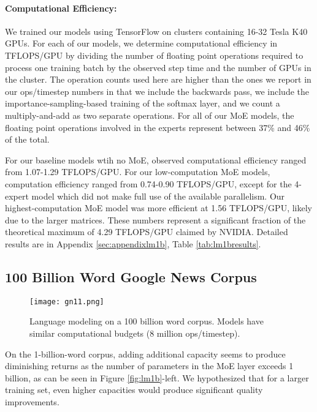 \documentclass{article} \pdfoutput=1
\begin{document}
\paragraph{Computational Efficiency:} We trained our models using TensorFlow \citep{Abadi16} on clusters containing 16-32 Tesla K40 GPUs.  For each of our models, we determine computational efficiency in TFLOPS/GPU by dividing the number of floating point operations required to process one training batch by the observed step time and the number of GPUs in the cluster.  The operation counts used here are higher than the ones we report in our ops/timestep numbers in that we include the backwards pass, we include the importance-sampling-based training of the softmax layer, and we count a multiply-and-add as two separate operations.  For all of our MoE models, the floating point operations involved in the experts represent between 37\% and 46\% of the total. 

For our baseline models wtih no MoE, observed computational efficiency ranged from 1.07-1.29 TFLOPS/GPU.  For our low-computation MoE models, computation efficiency ranged from 0.74-0.90 TFLOPS/GPU, except for the 4-expert model which did not make full use of the available parallelism.  Our highest-computation MoE model was more efficient at 1.56 TFLOPS/GPU, likely due to the larger matrices.   These numbers represent a significant fraction of the theoretical maximum of 4.29 TFLOPS/GPU claimed by NVIDIA.  Detailed results are in Appendix \ref{sec:appendixlm1b}, Table \ref{tab:lm1bresults}. 



\subsection{100 Billion Word Google News Corpus}


\begin{figure}[h!]
\centering
\texttt{[image: gn11.png]}
\caption{Language modeling on a 100 billion word corpus.  Models have similar computational budgets (8 million ops/timestep).}
\label{fig:gn11}
\end{figure}

On the 1-billion-word corpus, adding additional capacity seems to produce diminishing returns as the number of parameters in the MoE layer exceeds 1 billion, as can be seen in Figure \ref{fig:lm1b}-left.   We hypothesized that for a larger training set, even higher capacities would produce significant quality improvements.
\end{document}
